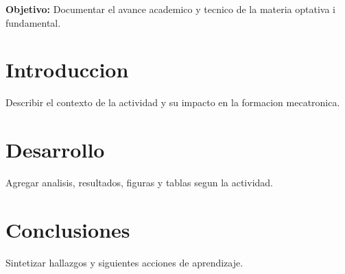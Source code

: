 \documentclass[spanish,letterpaper,oneside]{article}
\begin{document}
\templatePortrait
\templatePagecfg
\onehalfspacing

\begin{abstractd}
\textbf{Objetivo:} Documentar el avance academico y tecnico de la materia optativa i fundamental.
\end{abstractd}

\templateIndex
\templateFinalcfg

\section{Introduccion}
Describir el contexto de la actividad y su impacto en la formacion mecatronica.

\section{Desarrollo}
Agregar analisis, resultados, figuras y tablas segun la actividad.

\section{Conclusiones}
Sintetizar hallazgos y siguientes acciones de aprendizaje.



\end{document}
